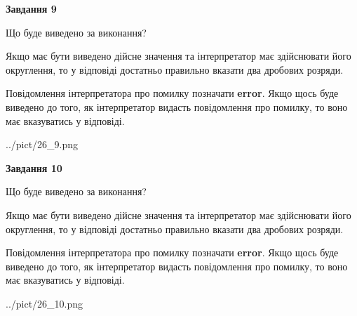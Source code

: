 \documentclass[12pt, ukrainian]{article}
\begin{document}
{\begin {Large}
{\begin {center}\textbf{Завдання 9}\end {center}}\par
Що буде виведено за виконання? \par

Якщо має бути виведено дійсне значення та інтерпретатор має здійснювати його округлення, 
то у відповіді достатньо правильно вказати два дробових розряди.

Повідомлення інтерпретатора про помилку позначати \textbf{error}.
Якщо щось буде виведено до того, як інтерпретатор видасть повідомлення про помилку, 
то воно має вказуватись у відповіді. \par

\begin{center}
	{../pict/26_9.png}
\end{center}
\newpage

{\begin {center}\textbf{Завдання 10}\end {center}}\par
Що буде виведено за виконання? \par

Якщо має бути виведено дійсне значення та інтерпретатор має здійснювати його округлення, 
то у відповіді достатньо правильно вказати два дробових розряди.

Повідомлення інтерпретатора про помилку позначати \textbf{error}.
Якщо щось буде виведено до того, як інтерпретатор видасть повідомлення про помилку, 
то воно має вказуватись у відповіді. \par

\begin{center}
	{../pict/26_10.png}
\end{center}
\newpage

\end {Large}}
\end{document}
